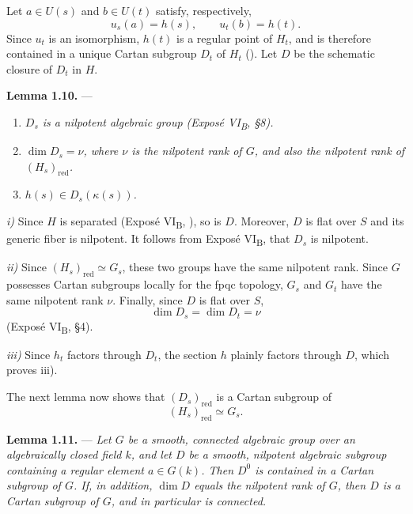Let \(a\in U(s)\) and \(b\in U(t)\) satisfy, respectively,
\[
  u_s(a)=h(s),
  \qquad
  u_t(b)=h(t).
\]
Since \(u_t\) is an isomorphism, \(h(t)\) is a regular point of
\(H_t\), and is therefore contained in a unique Cartan subgroup
\(D_t\) of \(H_t\) (). Let \(D\) be the schematic
closure of \(D_t\) in \(H\).

\medskip
\noindent{}%
\textbf{Lemma 1.10.} ---
\begin{enumerate}
\item[\textit{i)}] \textit{\(D_s\) is a nilpotent algebraic group
(Exposé VI\textsubscript{B}, \S8).}
\item[\textit{ii)}] \textit{\(\dim D_s=\nu\), where \(\nu\) is the
nilpotent rank of \(G\), and also the nilpotent rank of
\((H_s)_{\mathrm{red}}\).}
\item[\textit{iii)}] \textit{\(h(s)\in D_s(\kappa(s))\).}
\end{enumerate}

\noindent\textit{i)}
Since \(H\) is separated (Exposé VI\textsubscript{B}, ), so is
\(D\). Moreover, \(D\) is flat over \(S\) and its generic fiber is
nilpotent. It follows from Exposé VI\textsubscript{B},  that
\(D_s\) is nilpotent.

\smallskip
\noindent\textit{ii)}
Since \((H_s)_{\mathrm{red}}\simeq G_s\), these two groups have the
same nilpotent rank. Since \(G\) possesses Cartan subgroups locally
for the fpqc topology, \(G_s\) and \(G_t\) have the same nilpotent
rank \(\nu\). Finally, since \(D\) is flat over \(S\),
\[
  \dim D_s=\dim D_t=\nu
\]
(Exposé VI\textsubscript{B}, \S4).

\smallskip
\noindent\textit{iii)}
Since \(h_t\) factors through \(D_t\), the section \(h\) plainly
factors through \(D\), which proves iii).

The next lemma now shows that \((D_s)_{\mathrm{red}}\) is a Cartan
subgroup of
\[
  (H_s)_{\mathrm{red}}\simeq G_s.
\]

\medskip
\noindent{}%
\textbf{Lemma 1.11.} --- \textit{Let \(G\) be a smooth, connected
algebraic group over an algebraically closed field \(k\), and let
\(D\) be a smooth, nilpotent algebraic subgroup containing a regular
element \(a\in G(k)\). Then \(D^0\) is contained in a Cartan subgroup
of \(G\). If, in addition, \(\dim D\) equals the nilpotent rank of
\(G\), then \(D\) is a Cartan subgroup of \(G\), and in particular is
connected.}

